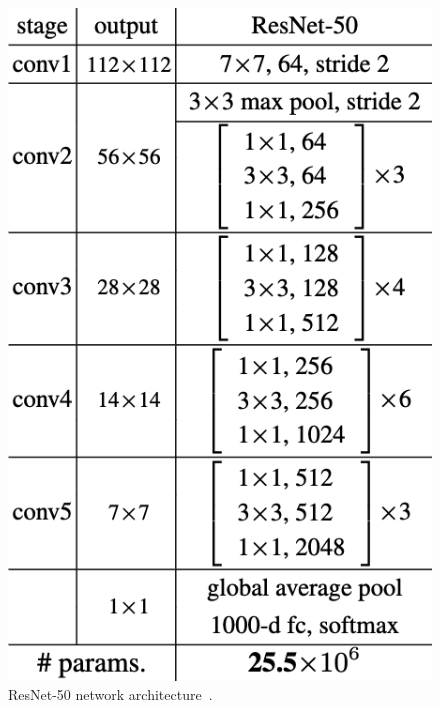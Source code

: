 \begin{figure}
    \includegraphics[width=.6\linewidth]{figures/resnet50.png}
    \caption{ResNet-50 network architecture~\cite{he2015deep}.}
    \label{fig:resnet}
\end{figure}

